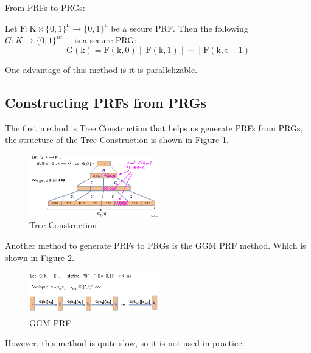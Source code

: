 \begin{method}  From PRFs to PRGs:

    Let $\mathrm{F}: \mathrm{K} \times\{0,1\}^{\mathrm{n}} \rightarrow\{0,1\}^{\mathrm{n}}$ be a secure PRF.
    Then the following $G: K \rightarrow\{0,1\}^{n t} \quad$ is a secure PRG:
    $$
    \mathrm{G}(\mathrm{k})=\mathrm{F}(\mathrm{k}, 0)\|\mathrm{F}(\mathrm{k}, 1)\| \cdots \| \mathrm{F}(\mathrm{k}, \mathrm{t}-1)
    $$
        
\end{method}

One advantage of this method is it is parallelizable.

\subsection{Constructing PRFs from PRGs}

The first method is Tree Construction that helps us generate PRFs from PRGs, the structure of the Tree Construction is shown in Figure \ref{fig: 03 Tree Construction}.

\begin{figure}[h]
    \centering
    \includegraphics[width=0.5\textwidth]{Stanford_Crypto_1/fig/03_block_cipher/Tree Construction.png}
    \caption{Tree Construction}
    \label{fig: 03 Tree Construction}
\end{figure}

Another method to generate PRFs to PRGs is the GGM PRF method. Which is shown in Figure \ref{fig: 03 GGM PRF}.

\begin{figure}[h]
    \centering
    \includegraphics[width=0.5\textwidth]{Stanford_Crypto_1/fig/03_block_cipher/GGM PRF.png}
    \caption{GGM PRF}
    \label{fig: 03 GGM PRF}
\end{figure}

However, this method is quite slow, so it is not used in practice.

